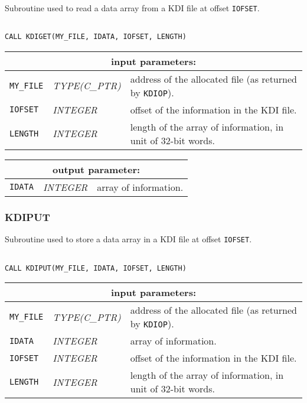 Subroutine used to read a data array from a KDI file at offset {\tt IOFSET}.

\begin{verbatim}

CALL KDIGET(MY_FILE, IDATA, IOFSET, LENGTH)
\end{verbatim}

\noindent
\begin{tabular}{|p{1.5cm}|p{3cm}|p{10cm}|}
\hline
\multicolumn{3}{|c|}{\bf input parameters:} \\
\hline
{\tt MY\_FILE} & {\it TYPE(C\_PTR)} &  address of the allocated file (as returned by {\tt KDIOP}). \\
\hline
{\tt IOFSET} & {\it INTEGER}  & offset of the information in the KDI file. \\
\hline
{\tt LENGTH} & {\it INTEGER}  & length of the array of information, in unit of 32-bit words. \\
\hline
\end{tabular}

\vskip 0.4cm
\noindent
\begin{tabular}{|p{1.5cm}|p{3cm}|p{10cm}|}
\hline
\multicolumn{3}{|c|}{\bf output parameter:} \\
\hline
{\tt IDATA} & {\it INTEGER}  & array of information.  \\
\hline
\end{tabular}

\subsubsection{KDIPUT}

Subroutine used to store a data array in a KDI file at offset {\tt IOFSET}.

\begin{verbatim}

CALL KDIPUT(MY_FILE, IDATA, IOFSET, LENGTH)
\end{verbatim}

\noindent
\begin{tabular}{|p{1.5cm}|p{3cm}|p{10cm}|}
\hline
\multicolumn{3}{|c|}{\bf input parameters:} \\
\hline
{\tt MY\_FILE} & {\it TYPE(C\_PTR)} &  address of the allocated file (as returned by {\tt KDIOP}). \\
\hline
{\tt IDATA} & {\it INTEGER}  & array of information.  \\
\hline
{\tt IOFSET} & {\it INTEGER}  & offset of the information in the KDI file. \\
\hline
{\tt LENGTH} & {\it INTEGER}  & length of the array of information, in unit of 32-bit words. \\
\hline
\end{tabular}

